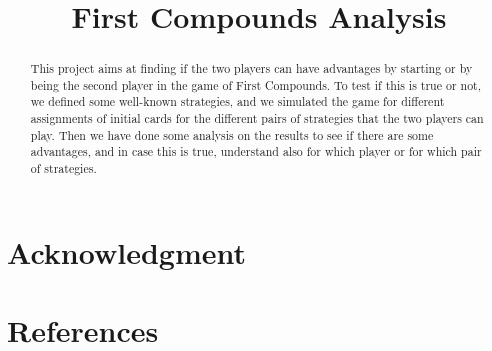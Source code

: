 \documentclass[conference]{IEEEtran}
\begin{document}
\title{First Compounds Analysis}

\author{
\and
{}
\and
{}
}
\maketitle

\begin{abstract}
This project aims at finding if the two players can have advantages by starting or by being the second player in the game of First Compounds. To test if this is true or not, we defined some well-known strategies, and we simulated the game for different assignments of initial cards for the different pairs of strategies that the two players can play. Then we have done some analysis on the results to see if there are some advantages, and in case this is true, understand also for which player or for which pair of strategies.
\end{abstract}







\section*{Acknowledgment}


\section*{References}
\end{document}
